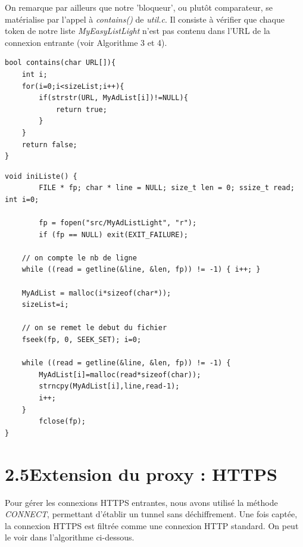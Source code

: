 \documentclass[12pt, a4paper]{report}
\begin{document}
\hspace{0.40cm}On remarque par ailleurs que notre 'bloqueur', ou plutôt comparateur, se matérialise par l'appel à \textit{contains()} de \textit{util.c}. Il consiste à vérifier que chaque token de notre liste \textit{MyEasyListLight} n'est pas contenu dans l'URL de la connexion entrante (voir Algorithme 3 et 4).\\

\renewcommand{\lstlistingname}{Algorithme}
\begin{lstlisting}[caption=Fonction contains() (util.c)]
bool contains(char URL[]){
	int i;
	for(i=0;i<sizeList;i++){
		if(strstr(URL, MyAdList[i])!=NULL){
			return true;
		}
	}
	return false;
}
\end{lstlisting}

\renewcommand{\lstlistingname}{Algorithme}
\begin{lstlisting}[caption=Fonction iniListe() qui charge la liste MyAdListLight(util.c)]
void iniListe() {
        FILE * fp; char * line = NULL; size_t len = 0; ssize_t read; int i=0;

        fp = fopen("src/MyAdListLight", "r");
        if (fp == NULL)	exit(EXIT_FAILURE);
	
	// on compte le nb de ligne
	while ((read = getline(&line, &len, fp)) != -1) { i++; }
	
	MyAdList = malloc(i*sizeof(char*));
	sizeList=i; 

	// on se remet le debut du fichier
	fseek(fp, 0, SEEK_SET); i=0;

	while ((read = getline(&line, &len, fp)) != -1) {
		MyAdList[i]=malloc(read*sizeof(char));
		strncpy(MyAdList[i],line,read-1);
		i++;	
	}
        fclose(fp);
}
\end{lstlisting}



\newpage
\hypersetup{linkcolor=blue}
\section*{\hspace{0.6cm}2.5\hspace{0.6cm}Extension du proxy : HTTPS}
\hspace{1cm} Pour gérer les connexions HTTPS entrantes, nous avons utilisé la méthode \textit{CONNECT}, permettant d'établir un tunnel sans déchiffrement. Une fois captée, la connexion HTTPS est filtrée comme une connexion HTTP standard. On peut le voir dans l'algorithme ci-dessous.\\
\end{document}
